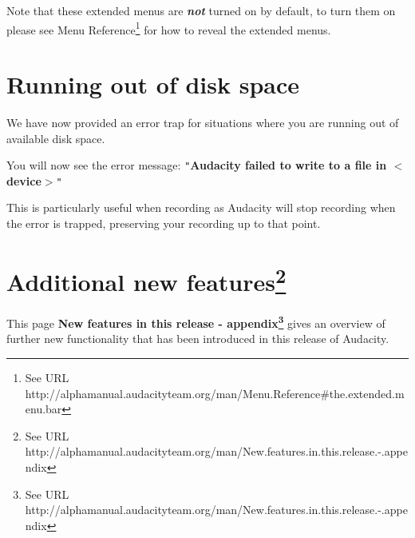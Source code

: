 Note that these extended menus are \textit{\textbf{not}} turned on by default, to turn them on please see Menu Reference\footnote{See URL http://alphamanual.audacityteam.org/man/Menu.Reference\#the.extended.menu.bar} for how to reveal the extended menus.





\section{
Running out of disk space
}


We have now provided an error trap for situations where you are running out of available disk space.

You will now see the error message:
\texttt{{}"{}}\textbf{Audacity failed to write to a file in \mbox{$<$}device\mbox{$>$}}\texttt{{}"{}}

This is particularly useful when recording as Audacity will stop recording when the error is trapped, preserving your recording up to that point.




\section{
Additional new features\protect\footnote{See URL http://alphamanual.audacityteam.org/man/New.features.in.this.release.-.appendix}
}


This page \textbf{New features in this release - appendix\footnote{See URL http://alphamanual.audacityteam.org/man/New.features.in.this.release.-.appendix}} gives an overview of further new functionality that has been introduced in this release of Audacity.

